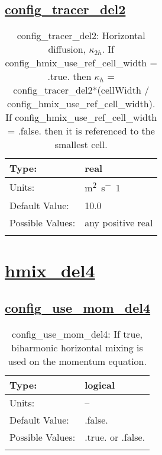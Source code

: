 \subsection[config\_tracer\_del2]{\hyperref[sec:nm_tab_hmix_del2]{config\_tracer\_del2}}
\label{subsec:nm_sec_config_tracer_del2}
\begin{center}
\begin{longtable}{| p{2.0in} || p{4.0in} |}
    \hline
    Type: & real \\
    \hline
    Units: & \si{m^2.s^-1} \\
    \hline
    Default Value: & 10.0 \\
    \hline
    Possible Values: & any positive real \\
    \hline
    \caption{config\_tracer\_del2: Horizontal diffusion, $\kappa_{2h}$. If config\_hmix\_use\_ref\_cell\_width = .true. then $\kappa_h$ = config\_tracer\_del2*(cellWidth / config\_hmix\_use\_ref\_cell\_width). If config\_hmix\_use\_ref\_cell\_width = .false. then it is referenced to the smallest cell.}
\end{longtable}
\end{center}
\section[hmix\_del4]{\hyperref[sec:nm_tab_hmix_del4]{hmix\_del4}}
\label{sec:nm_sec_hmix_del4}
\subsection[config\_use\_mom\_del4]{\hyperref[sec:nm_tab_hmix_del4]{config\_use\_mom\_del4}}
\label{subsec:nm_sec_config_use_mom_del4}
\begin{center}
\begin{longtable}{| p{2.0in} || p{4.0in} |}
    \hline
    Type: & logical \\
    \hline
    Units: & -- \\
    \hline
    Default Value: & .false. \\
    \hline
    Possible Values: & .true. or .false. \\
    \hline
    \caption{config\_use\_mom\_del4: If true, biharmonic horizontal mixing is used on the momentum equation.}
\end{longtable}
\end{center}
